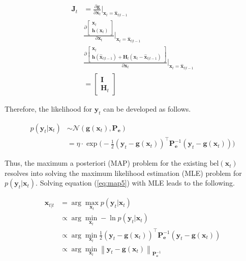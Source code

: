 \documentclass[10pt]{article}
\begin{document}
\begin{equation} 
	\begin{aligned} 
		\mathbf{J}_{t} & = \frac{\partial \mathbf{g}}{\partial \mathbf{x}_{t}}\bigg|_{\mathbf{x}_{t} = \hat{\mathbf{x}}_{t|t-1}} \\ 
		& \frac{\partial \begin{bmatrix} \mathbf{x}_{t} \\ \mathbf{h}(\mathbf{x}_{t}) \end{bmatrix} }{\partial \mathbf{x}_{t}}\bigg|_{\mathbf{x}_{t} = \hat{\mathbf{x}}_{t|t-1}} \\
		& \frac{\partial \begin{bmatrix} \mathbf{x}_{t} \\ \mathbf{h}(\hat{\mathbf{x}}_{t|t-1}) + \mathbf{H}_{t} (\mathbf{x}_{t} - \hat{\mathbf{x}}_{t|t-1}) \end{bmatrix} }{\partial \mathbf{x}_{t}}\bigg|_{\mathbf{x}_{t} = \hat{\mathbf{x}}_{t|t-1}} \\
		& = \begin{bmatrix} \mathbf{I} \\ \mathbf{H}_{t} \end{bmatrix}
	\end{aligned} 
\end{equation}

Therefore, the likelihood for $\mathbf{y}_{t}$ can be developed as follows.

\begin{equation}  \label{eq:map5}
	\begin{aligned} 
		p(\mathbf{y}_{t} | \mathbf{x}_{t}) & \sim \mathcal{N}(\mathbf{g}(\mathbf{x}_{t}), \mathbf{P}_{\mathbf{e}}) \\
		& = \eta \cdot \exp\bigg( -\frac{1}{2}(\mathbf{y}_{t} - \mathbf{g}(\mathbf{x}_{t}))^{\intercal} \mathbf{P}_{\mathbf{e}}^{-1}(\mathbf{y}_{t} - \mathbf{g}(\mathbf{x}_{t})) \bigg)
	\end{aligned} 
\end{equation}

Thus, the maximum a posteriori (MAP) problem for the existing $\text{bel}(\mathbf{x}_{t})$ resolves into solving the maximum likelihood estimation (MLE) problem for $p(\mathbf{y}_{t} | \mathbf{x}_{t})$. Solving equation (\ref{eq:map5}) with MLE leads to the following.

\begin{equation}  \label{eq:map6}
	\begin{aligned} 
		\hat{\mathbf{x}}_{t|t} & = \arg\max_{\mathbf{x}_{t}} p(\mathbf{y}_{t} | \mathbf{x}_{t}) \\ 
		& \propto \arg\min_{\mathbf{x}_{t}} -\ln p(\mathbf{y}_{t} | \mathbf{x}_{t}) \\ 
		& \propto \arg\min_{\mathbf{x}_{t}} \frac{1}{2} (\mathbf{y}_{t} - \mathbf{g}(\mathbf{x}_{t}))^{\intercal} \mathbf{P}_{\mathbf{e}}^{-1}(\mathbf{y}_{t} - \mathbf{g}(\mathbf{x}_{t})) \\
		& \propto \arg\min_{\mathbf{x}_{t}} \left\| \mathbf{y}_{t} - \mathbf{g}(\mathbf{x}_{t}) \right\|_{\mathbf{P}_{\mathbf{e}}^{-1}}
	\end{aligned} 
\end{equation}
\end{document}
